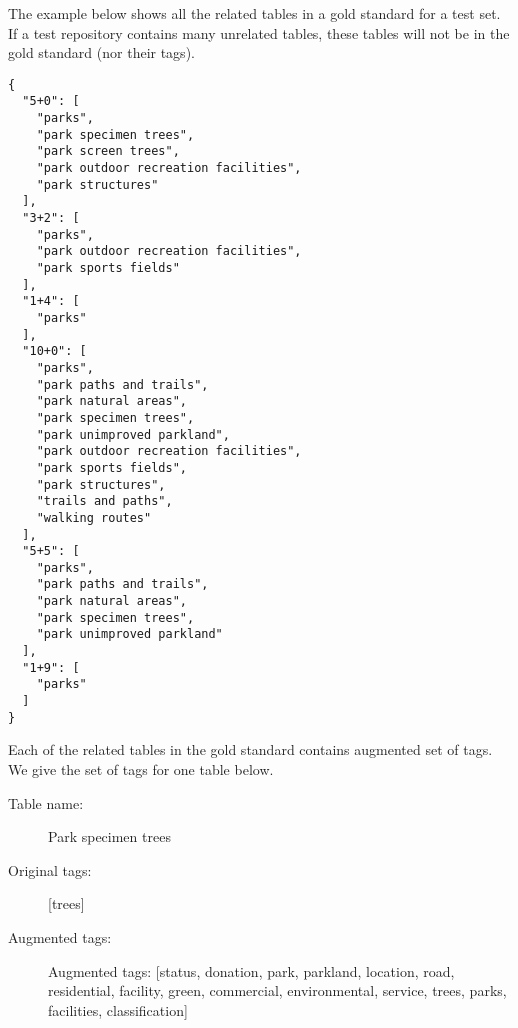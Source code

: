 The example below shows all the related tables in a gold standard for a test set. If a test repository contains many unrelated tables, these tables will not be in the gold standard (nor their tags).
\begin{lstlisting}
{
  "5+0": [
    "parks",
    "park specimen trees",
    "park screen trees",
    "park outdoor recreation facilities",
    "park structures"
  ],
  "3+2": [
    "parks",
    "park outdoor recreation facilities",
    "park sports fields"
  ],
  "1+4": [
    "parks"
  ],
  "10+0": [
    "parks",
    "park paths and trails",
    "park natural areas",
    "park specimen trees",
    "park unimproved parkland",
    "park outdoor recreation facilities",
    "park sports fields",
    "park structures",
    "trails and paths",
    "walking routes"
  ],
  "5+5": [
    "parks",
    "park paths and trails",
    "park natural areas",
    "park specimen trees",
    "park unimproved parkland"
  ],
  "1+9": [
    "parks"
  ]
}
\end{lstlisting}

Each of the related tables in the gold standard contains augmented set of tags. We give the set of tags for one table below.

\begin{description}
\item[Table name:]Park specimen trees
\item[Original tags:][trees]
\item[Augmented tags:]Augmented tags: [status, donation, park, parkland, location, road, residential, facility, green, commercial, environmental, service, trees, parks, facilities, classification]
\end{description}
\endinput